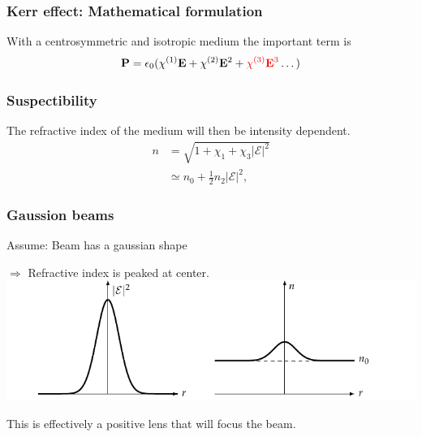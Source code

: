 \begin{frame}
  \frametitle{Kerr effect: Mathematical formulation}

  With a centrosymmetric and isotropic medium the important term is
  \[
  \mathbf P = \epsilon_0 ( \chi^{\textup{(1)}} \mathbf E +
  {\chi^{\textup{(2)}} \mathbf E^2} + \textcolor{red}{\chi^{\textup{(3)}} \mathbf E^3} \dots )
  \]
\end{frame}

\begin{frame}
  \frametitle{Suspectibility}

  The refractive index of the medium will then be intensity dependent. 
  \begin{align*}
    n &= \sqrt{1 + \chi_1 + \chi_3 |\mathcal{E}|^2}\\
    &\simeq n_0 + \tfrac{1}{2} n_2 |\mathcal{E}|^2,
  \end{align*}
\end{frame}

\begin{frame}
  \frametitle{Gaussion beams}
  Assume: Beam has a gaussian shape

  $\Rightarrow$ Refractive index is peaked at center.
  {\centering
  \includegraphics[width=1\columnwidth]{gaussrefrac}}

This is effectively a positive lens that will focus the beam. 
\end{frame}




